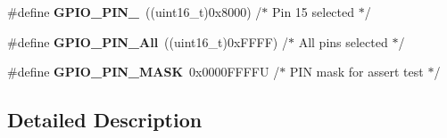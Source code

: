 \begin{DoxyCompactItemize}
\item 
\mbox{\label{group___g_p_i_o__pins__define_ga77be5756e80bcdf18e1aa39b35d1d640}} 
\#define {\bfseries G\+P\+I\+O\+\_\+\+P\+I\+N\+\_}~((uint16\+\_\+t)0x8000)  /$\ast$ Pin 15 selected   $\ast$/
\item 
\mbox{\label{group___g_p_i_o__pins__define_gac04170878de13aa9785f6bd666c9faa5}} 
\#define {\bfseries G\+P\+I\+O\+\_\+\+P\+I\+N\+\_\+\+All}~((uint16\+\_\+t)0x\+F\+F\+F\+F)  /$\ast$ All pins selected $\ast$/
\item 
\mbox{\label{group___g_p_i_o__pins__define_gab135afee57cdef0f647ab153f88b6d2f}} 
\#define {\bfseries G\+P\+I\+O\+\_\+\+P\+I\+N\+\_\+\+M\+A\+SK}~0x0000\+F\+F\+F\+F\+U /$\ast$ P\+I\+N mask for assert test $\ast$/
\end{DoxyCompactItemize}


\subsection{Detailed Description}
